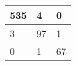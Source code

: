 \begin{tabular}{lll}
\hline
  535 & 4 & 0 \\
\hline
  3 & 97 & 1 \\
\hline
  0 & 1 & 67 \\
\hline
\end{tabular}
